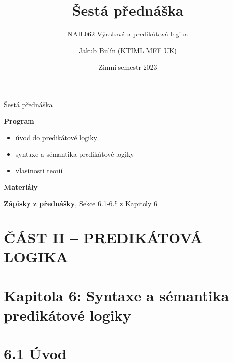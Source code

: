 \documentclass{beamer}
\title{Šestá přednáška}
\subtitle{NAIL062 Výroková a predikátová logika}
\author{Jakub Bulín (KTIML MFF UK)}
\date{Zimní semestr 2023}
\begin{document}
\frame{\titlepage}


\begin{frame}{Šestá přednáška}

    \textbf{Program}
        \begin{itemize}
            \item úvod do predikátové logiky
            \item syntaxe a sémantika predikátové logiky
            \item vlastnosti teorií
        \end{itemize}

    \textbf{Materiály}

        \href{https://github.com/jbulin-mff-uk/nail062/raw/main/lecture/lecture-notes/lecture-notes.pdf}{\alert{\textbf{Zápisky z přednášky}}}, Sekce 6.1-6.5 z Kapitoly 6

\end{frame}


\section{ČÁST II -- PREDIKÁTOVÁ LOGIKA}


\section{\sc Kapitola 6: Syntaxe a sémantika predikátové logiky}


\section{6.1 Úvod}
\end{document}
